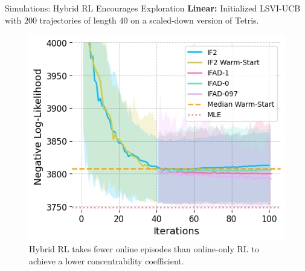 \documentclass[final]{beamer}
\newlength{\colwidth}
\begin{document}
\begin{frame}[t]
\begin{columns}[t]
\begin{column}{\colwidth}
\begin{exampleblock}{Simulations: Hybrid RL Encourages Exploration}
    \textbf{Linear:} Initialized LSVI-UCB \cite{jin2020provably} with $200$ trajectories of length $40$ on a scaled-down version of Tetris.

    \begin{figure}[H]
    \centering
    \includegraphics[scale=1]{imgs/095/optim.png}
    \caption{Hybrid RL takes fewer online episodes than online-only RL to achieve a lower concentrability coefficient.}
    \label{fig:linear-coverage}
\end{figure}


    
  \end{exampleblock}


\end{column}
\end{columns}
\end{frame}
\end{document}
